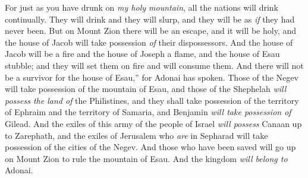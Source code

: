 \begin{biblechapter}
\verse For just as you have drunk on \textit{my holy mountain}, all the nations will drink continually. They will drink and they will slurp, and they will be as \textit{if} they had never been.
\verse But on Mount Zion there will be an escape, and it will be holy, and the house of Jacob will take possession \textit{of} their dispossessors.
\verse And the house of Jacob will be a fire and the house of Joseph a flame, and the house of Esau stubble; and they will set them on fire and will consume them. And there will not be a survivor for the house of Esau,” for Adonai has spoken.
 Those of the Negev will take possession of the mountain of Esau, and those of the Shephelah \textit{will possess the land of} the Philistines, and they shall take possession of the territory of Ephraim and the territory of Samaria, and Benjamin \textit{will take possession of} Gilead.
\verse And the exiles of this army of the people of Israel \textit{will possess} Canaan up to Zarephath, and the exiles of Jerusalem who \textit{are} in Sepharad will take possession of the cities of the Negev.
\verse And those who have been saved will go up on Mount Zion to rule the mountain of Esau. And the kingdom \textit{will belong to} Adonai.
\end{biblechapter}

